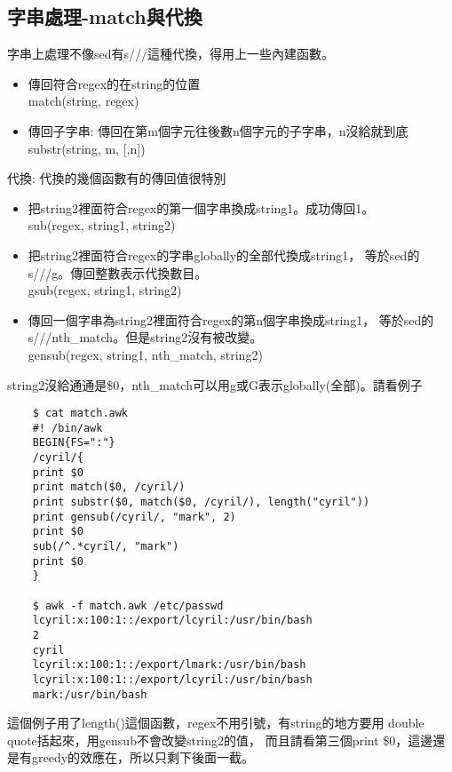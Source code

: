     \subsection{字串處理-match與代換}
    字串上處理不像sed有s///這種代換，得用上一些內建函數。
    \begin{itemize}
    \item 傳回符合regex的在string的位置\\
    match(string, regex)
    \item 傳回子字串: 傳回在第m個字元往後數n個字元的子字串，n沒給就到底\\
    substr(string, m, [,n])
    \end{itemize}
    代換: 代換的幾個函數有的傳回值很特別
    \begin{itemize}
    \item 把string2裡面符合regex的第一個字串換成string1。成功傳回1。\\
    sub(regex, string1, string2)
    \item 把string2裡面符合regex的字串globally的全部代換成string1，
    等於sed的s///g。傳回整數表示代換數目。\\
    gsub(regex, string1, string2)
    \item 傳回一個字串為string2裡面符合regex的第n個字串換成string1，
    等於sed的s///nth\_match。但是string2沒有被改變。\\
    gensub(regex, string1, nth\_match, string2)
    \end{itemize}
    string2沒給通通是\$0，nth\_match可以用g或G表示globally(全部)。請看例子

    \begin{verbatim}
    $ cat match.awk
    #! /bin/awk
    BEGIN{FS=":"}
    /cyril/{
    print $0
    print match($0, /cyril/)
    print substr($0, match($0, /cyril/), length("cyril"))
    print gensub(/cyril/, "mark", 2)
    print $0
    sub(/^.*cyril/, "mark")
    print $0
    }

    $ awk -f match.awk /etc/passwd
    lcyril:x:100:1::/export/lcyril:/usr/bin/bash
    2
    cyril
    lcyril:x:100:1::/export/lmark:/usr/bin/bash
    lcyril:x:100:1::/export/lcyril:/usr/bin/bash
    mark:/usr/bin/bash
    \end{verbatim}
    這個例子用了length()這個函數，regex不用引號，有string的地方要用
    double quote括起來，用gensub不會改變string2的值，
    而且請看第三個print \$0，這邊還是有greedy的效應在，所以只剩下後面一截。

